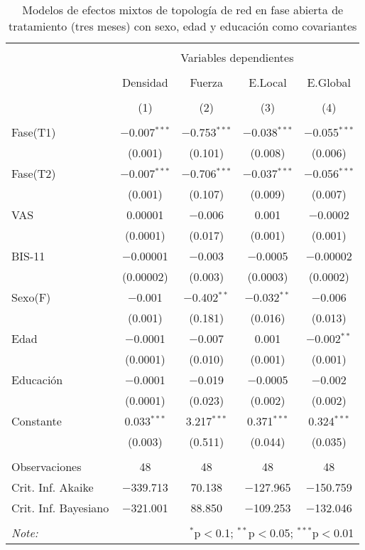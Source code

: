 \begin{table}[!htbp] \centering
    \small
  \caption{Modelos de efectos mixtos de topología de red en fase abierta de tratamiento (tres meses) con sexo, edad y educación como covariantes}
  \label{tab:memL1}
\begin{tabular}{@{\extracolsep{5pt}}lcccc}
\\[-1.8ex]\hline
\hline \\[-1.8ex]
 & \multicolumn{4}{c}{Variables dependientes} \\
\cline{2-5}
\\[-1.8ex] & Densidad & Fuerza & E.Local & E.Global \\
\\[-1.8ex] & (1) & (2) & (3) & (4)\\
\hline \\[-1.8ex]
 Fase(T1) & $-$0.007$^{***}$ & $-$0.753$^{***}$ & $-$0.038$^{***}$ & $-$0.055$^{***}$ \\
  & (0.001) & (0.101) & (0.008) & (0.006) \\
  Fase(T2) & $-$0.007$^{***}$ & $-$0.706$^{***}$ & $-$0.037$^{***}$ & $-$0.056$^{***}$ \\
  & (0.001) & (0.107) & (0.009) & (0.007) \\
  VAS & 0.00001 & $-$0.006 & 0.001 & $-$0.0002 \\
  & (0.0001) & (0.017) & (0.001) & (0.001) \\
  BIS-11 & $-$0.00001 & $-$0.003 & $-$0.0005 & $-$0.00002 \\
  & (0.00002) & (0.003) & (0.0003) & (0.0002) \\
  Sexo(F) & $-$0.001 & $-$0.402$^{**}$ & $-$0.032$^{**}$ & $-$0.006 \\
  & (0.001) & (0.181) & (0.016) & (0.013) \\
  Edad & $-$0.0001 & $-$0.007 & 0.001 & $-$0.002$^{**}$ \\
  & (0.0001) & (0.010) & (0.001) & (0.001) \\
  Educación & $-$0.0001 & $-$0.019 & $-$0.0005 & $-$0.002 \\
  & (0.0001) & (0.023) & (0.002) & (0.002) \\
  Constante & 0.033$^{***}$ & 3.217$^{***}$ & 0.371$^{***}$ & 0.324$^{***}$ \\
  & (0.003) & (0.511) & (0.044) & (0.035) \\
 \hline \\[-1.8ex]
Observaciones & 48 & 48 & 48 & 48 \\
Crit. Inf. Akaike & $-$339.713 & 70.138 & $-$127.965 & $-$150.759 \\
Crit. Inf. Bayesiano & $-$321.001 & 88.850 & $-$109.253 & $-$132.046 \\
\hline
\hline \\[-1.8ex]
\textit{Note:}  & \multicolumn{4}{r}{$^{*}$p$<$0.1; $^{**}$p$<$0.05; $^{***}$p$<$0.01} \\
\end{tabular}
\end{table}

